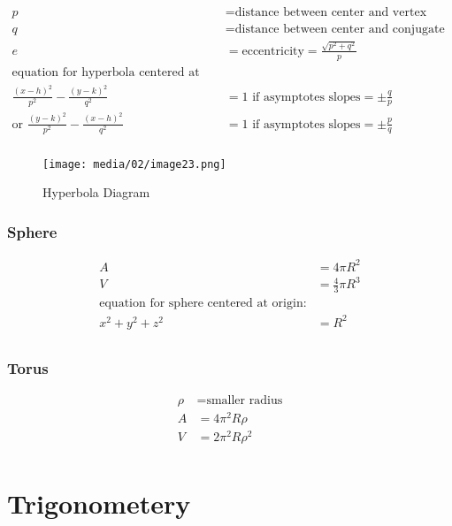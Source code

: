 \documentclass[
]{book}
\begin{document}
\begin{align}
p &= \text{distance between center and vertex} \\
q &= \text{distance between center and conjugate axis} \\
e &= \text{eccentricity} = \frac{ \sqrt{p^2 +q^2} }{p} \\
\text{equation for hyperbola centered at (h, k):} \\
\frac{(x-h)^2}{p^2} - \frac{(y-k)^2}{q^2} &= 1 \text{ if asymptotes slopes} = \pm \frac{q}{p} \\
\text{or } \frac{(y-k)^2}{p^2} - \frac{(x-h)^2}{q^2} &= 1 \text{ if asymptotes slopes} = \pm \frac{p}{q} \\
\end{align}

\begin{figure}
\centering
\texttt{[image: media/02/image23.png]}
\caption{Hyperbola Diagram}
\end{figure}

\hypertarget{sphere}{%
\subsubsection*{Sphere}\label{sphere}}

\begin{align}
A &= 4 \pi R^2 \\
V &= \frac{4}{3} \pi R^3 \\
\text{equation for sphere centered at origin:} \\
x^2 + y^2 + z^2 &= R^2 \\
\end{align}

\hypertarget{torus}{%
\subsubsection*{Torus}\label{torus}}

\begin{align}
\rho &= \text{smaller radius} \\
A &= 4 \pi ^2 R \rho \\
V &= 2 \pi ^2 R \rho^2 \\
\end{align}

\hypertarget{trigonometery}{%
\section{Trigonometery}\label{trigonometery}}
\end{document}
